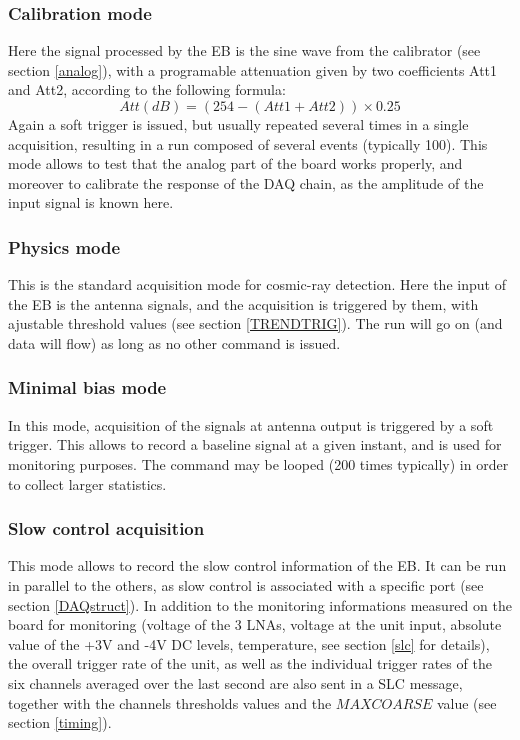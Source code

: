 \subsubsection{Calibration mode}
\label{calib}
Here the signal processed by the EB is the sine wave from the calibrator (see section \ref{analog}), with a programable attenuation given by two coefficients Att1 and Att2, according to the following formula: 
\begin{equation}
\label{attCalib}
Att(dB)=(254-(Att1+Att2))\times0.25
\end{equation}
Again a soft trigger is issued, but usually repeated several times in a single acquisition, resulting in a run composed of several events (typically 100). This mode allows to test that the analog part of the board works properly, and moreover to calibrate the response of the DAQ chain, as the amplitude of the input signal is known here.

\subsubsection{Physics mode}
This is the standard acquisition mode for cosmic-ray detection. Here the input of the EB is the antenna signals, and the acquisition is triggered by them, with ajustable threshold values (see section \ref{TRENDTRIG}). The run will go on (and data will flow) as long as no other command is issued. 

\subsubsection{Minimal bias mode}
\label{minbias}
In this mode, acquisition of the signals at antenna output is triggered by a soft trigger. This allows to record a baseline signal at a given instant, and is used for monitoring purposes. The command may be looped (200 times typically) in order to collect larger statistics. 

\subsubsection{Slow control acquisition}
\label{slcdaq}
This mode allows to record the slow control information of the EB. It can be run in parallel to the others, as slow control is associated with a specific port (see section \ref{DAQstruct}). In addition to the monitoring informations measured on the board for monitoring (voltage of the 3 LNAs, voltage at the unit input, absolute value of the +3V and -4V DC levels, temperature, see section \ref{slc} for details), the overall trigger rate of the unit, as well as the individual trigger rates of the six channels averaged over the last second are also sent in a SLC message, together with the channels thresholds values and the $MAXCOARSE$ value (see section \ref{timing}). 

